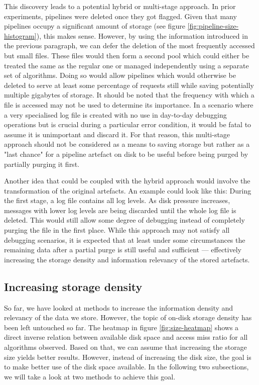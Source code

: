         This discovery leads to a potential hybrid or multi-stage approach. In prior experiments, pipelines were deleted once they got flagged. Given that many pipelines occupy a significant amount of storage (see figure \ref{fig:pipeline-size-histogram}), this makes sense. However, by using the information introduced in the previous paragraph, we can defer the deletion of the most frequently accessed but small files. These files would then form a second pool which could either be treated the same as the regular one or managed independently using a separate set of algorithms. Doing so would allow pipelines which would otherwise be deleted to serve at least some percentage of requests still while saving potentially multiple gigabytes of storage. It should be noted that the frequency with which a file is accessed may not be used to determine its importance. In a scenario where a very specialised log file is created with no use in day-to-day debugging operations but is crucial during a particular error condition, it would be fatal to assume it is unimportant and discard it. For that reason, this multi-stage approach should not be considered as a means to saving storage but rather as a "last chance" for a pipeline artefact on disk to be useful before being purged by partially purging it first.
        
        Another idea that could be coupled with the hybrid approach would involve the transformation of the original artefacts. An example could look like this: During the first stage, a log file contains all log levels. As disk pressure increases, messages with lower log levels are being discarded until the whole log file is deleted. This would still allow some degree of debugging instead of completely purging the file in the first place. While this approach may not satisfy all debugging scenarios, it is expected that at least under some circumstances the remaining data after a partial purge is still useful and sufficient — effectively increasing the storage density and information relevancy of the stored artefacts.

    \subsection{Increasing storage density}
        So far, we have looked at methods to increase the information density and relevancy of the data we store. However, the topic of on-disk storage density has been left untouched so far. The heatmap in figure \ref{fig:size-heatmap} shows a direct inverse relation between available disk space and access miss ratio for all algorithms observed. Based on that, we can assume that increasing the storage size yields better results. However, instead of increasing the disk size, the goal is to make better use of the disk space available. In the following two subsections, we will take a look at two methods to achieve this goal.
        
